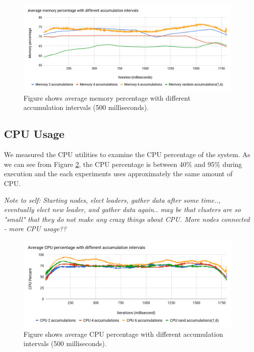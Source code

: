 \documentclass[USenglish]{uit-thesis}
\begin{document}

\begin{figure} 
\centering
\includegraphics[width=\textwidth]{Memchart.png}
\caption{Figure shows average memory percentage with different accumulation intervals (500 milliseconds).}
\label{fig:memChart}
\end{figure}


\subsection{CPU Usage}
We measured the CPU utilities to examine the CPU percentage of the system. As we can see from Figure \ref{fig:cpuChart}, the CPU percentage is between 40\% and 95\% during execution and the each experiments uses approximately the same amount of CPU.

\textit{Note to self: Starting nodes, elect leaders, gather data after some time.., eventually elect new leader, and gather data again..
may be that clusters are so "small" that they do not make any crazy things about CPU. More nodes connected - more CPU usage??}


\begin{figure} 
\centering
\includegraphics[width=\textwidth]{cpuChart.png}
\caption{Figure shows average CPU percentage with different accumulation intervals (500 milliseconds).}
\label{fig:cpuChart}
\end{figure}
\end{document}
